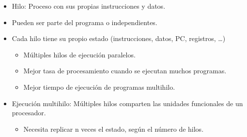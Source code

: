 \documentclass[12pt, twoside, openright]{report} %
\begin{document}
      \begin{itemize}
        \item
          Hilo: Proceso con sus propias instrucciones y datos.
        \item
          Pueden ser parte del programa o independientes.
        \item
          Cada hilo tiene su propio estado (instrucciones, datos, PC,
          registros, \ldots)

          \begin{itemize}
          
            \item
              Múltiples hilos de ejecución paralelos.
            \item
              Mejor tasa de procesamiento cuando se ejecutan muchos
              programas.
            \item
              Mejor tiempo de ejecución de programas multihilo.
          \end{itemize}
        \item
          Ejecución multihilo: Múltiples hilos comparten las unidades
          funcionales de un procesador.

          \begin{itemize}
          
            \item
            Necesita replicar n veces el estado, según el número de hilos.


\end{itemize}
\end{itemize}
\end{document}
